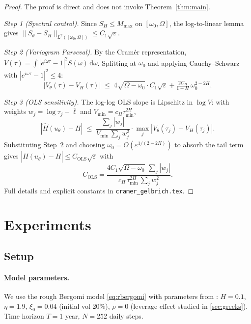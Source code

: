 \documentclass[11pt,a4paper]{article}
\begin{document}
\begin{proof}
 The proof is direct and does not invoke Theorem~\ref{thm:main}.

 \emph{Step 1 (Spectral control).}
 Since $S_H \leq M_{\max}$ on $[\omega_0,\Omega]$, the log-to-linear
 lemma \citep[Lemma~A.2]{TODO-paper1} gives
 $\|S_\theta - S_H\|_{L^2([\omega_0,\Omega])} \leq C_1\sqrt{\varepsilon}$.

 \emph{Step 2 (Variogram Parseval).}
 By the Cram\'er representation,
 $V(\tau) = \int|e^{i\omega\tau}-1|^2S(\omega)\,\mathrm{d}\omega$.
 Splitting at $\omega_0$ and applying Cauchy--Schwarz with
 $|e^{i\omega\tau}-1|^2\leq 4$:
 \[
  |V_\theta(\tau) - V_H(\tau)|
  \;\leq\; 4\sqrt{\Omega-\omega_0}\cdot C_1\sqrt{\varepsilon}
  + \tfrac{2C_H}{1-H}\,\omega_0^{2-2H}.
 \]

 \emph{Step 3 (OLS sensitivity).}
 The log-log OLS slope is Lipschitz in $\log V$: with weights
 $w_j = \log\tau_j - \bar{\ell}$ and
 $V_{\min} = c_H\tau_{\min}^{2H}$,
 \[
  |\hat H(u_\theta) - H|
  \;\leq\; \frac{\sum_j|w_j|}{V_{\min}\,\sum_j w_j^2}
   \cdot \max_j|V_\theta(\tau_j)-V_H(\tau_j)|.
 \]
 Substituting Step~2 and choosing
 $\omega_0 = O(\varepsilon^{1/(2-2H)})$ to absorb the tail term gives
 $|\hat H(u_\theta) - H| \leq C_{\mathrm{OLS}}\sqrt{\varepsilon}$
 with
 \[
  C_{\mathrm{OLS}} = \frac{4C_1\sqrt{\Omega-\omega_0}\,\sum_j|w_j|}
   {c_H\,\tau_{\min}^{2H}\,\sum_j w_j^2}.
 \]
 Full details and explicit constants in \texttt{cramer\_gelbrich.tex}.
\end{proof}

\section{Experiments}
\label{sec:experiments}

\subsection{Setup}

\paragraph{Model parameters.}
We use the rough Bergomi model \eqref{eq:rbergomi} with parameters
from \citet{gatheral2018volatility,bayer2016pricing}:
$H = 0.1$, $\eta = 1.9$, $\xi_0 = 0.04$ (initial vol 20\%),
$\rho = 0$ (leverage effect studied in \cref{sec:greeks}).
Time horizon $T = 1$ year, $N = 252$ daily steps.
\end{document}
